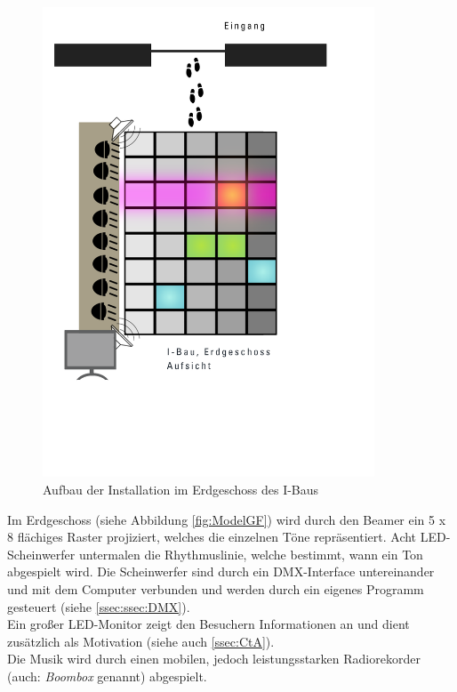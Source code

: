 \begin{figure}[htbp]
	\centering
		\includegraphics[width=0.88\textwidth]{images/ModelGroundFloor.png}
	\caption{Aufbau der Installation im Erdgeschoss des I-Baus}
	\label{fig:ModelGF}
\end{figure}

Im Erdgeschoss (siehe Abbildung \autoref{fig:ModelGF}) wird durch den Beamer ein 5 x 8 flächiges Raster projiziert, welches die einzelnen Töne repräsentiert. Acht LED-Scheinwerfer untermalen die Rhythmuslinie, welche bestimmt, wann ein Ton abgespielt wird. Die Scheinwerfer sind durch ein DMX-Interface untereinander und mit dem Computer verbunden und werden durch ein eigenes Programm gesteuert (siehe \autoref{ssec:ssec:DMX}).\\
Ein großer LED-Monitor zeigt den Besuchern Informationen an und dient zusätzlich als Motivation (siehe auch \autoref{ssec:CtA}).\\
Die Musik wird durch einen mobilen, jedoch leistungsstarken Radiorekorder (auch: \textit{Boombox} genannt) abgespielt.